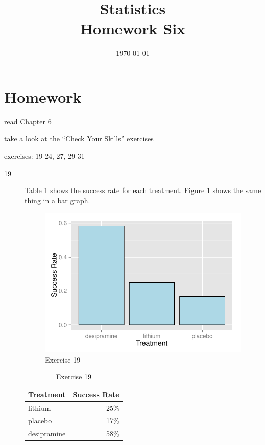 \documentclass[letterpaper, landscape]{exam}
\title{Statistics \\ Homework Six}
\date{\today}
\author{}
\begin{document}
  \maketitle

  \section{Homework}
    \begin{itemize*}
      \item read Chapter 6 
      \item take a look at the ``Check Your Skills'' exercises
      \item exercises: 19-24, 27, 29-31
    \end{itemize*}

  \ifprintanswers
    \begin{description}

      \item[19] Table \ref{tab:ex19} shows the success rate for each treatment. 
        Figure \ref{fig:ex19} shows the same thing in a bar graph.

        \begin{figure}[H]
          \centering
          \includegraphics[scale = 0.7]{figures/ex19.pdf}
          \caption{Exercise 19}
          \label{fig:ex19}
        \end{figure}

        \begin{table}[H]
          \centering
          \begin{tabular}{lr}
            \toprule
            Treatment   & Success Rate \\
            \midrule
            lithium     & 25\% \\
            placebo     & 17\% \\
            desipramine & 58\% \\
            \bottomrule
          \end{tabular}
          \caption{Exercise 19}
          \label{tab:ex19}
        \end{table}


\end{description}
\end{document}
